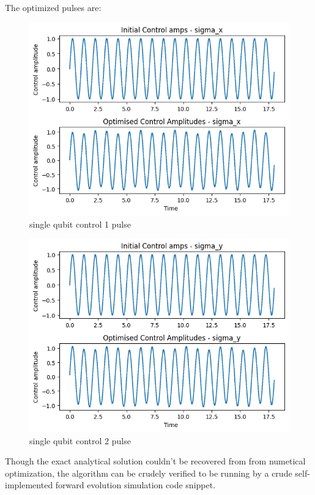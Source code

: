 \documentclass[12pt]{article}
\begin{document}
The optimized pulses are: 
\begin{figure}[H]
    \centering
    \includegraphics[width=0.95\linewidth]{single_qubit_control1.png}
    \caption{single qubit control 1 pulse}
    \label{fig:single_qubit_control1}
\end{figure}
\begin{figure}[H]
    \centering
    \includegraphics[width=0.95\linewidth]{single_qubit_control2.png}
    \caption{single qubit control 2 pulse}
    \label{fig:single_qubit_control2}
\end{figure}

Though the exact analytical solution couldn't be recovered from from numetical optimization, 
the algorithm can be crudely verified to be running by a crude self-implemented forward 
evolution simulation code snippet. 
\end{document}
